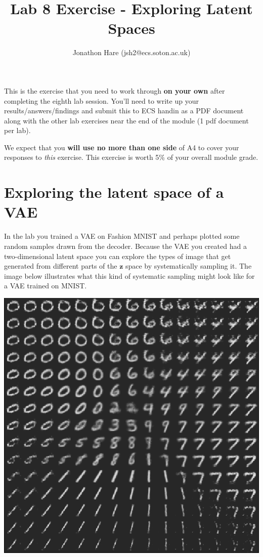 \documentclass[a4paper]{article}
\begin{document}
\lstset{language=Python,upquote=true}

\setlength{\leftskip}{20pt}
\title{Lab 8 Exercise - Exploring Latent Spaces}
\author{Jonathon Hare (jsh2@ecs.soton.ac.uk)}

\maketitle


This is the exercise that you need to work through \textbf{on your own} after completing the eighth lab session. You'll need to write up your results/answers/findings and submit this to ECS handin as a PDF document along with the other lab exercises near the end of the module (1 pdf document per lab). 

We expect that you \textbf{will use no more than one side} of A4 to cover your responses to \emph{this} exercise. This exercise is worth 5\% of your overall module grade.

\section{Exploring the latent space of a VAE}\label{vae}
In the lab you trained a VAE on Fashion MNIST and perhaps plotted some random samples drawn from the decoder. Because the VAE you created had a two-dimensional latent space you can explore the types of image that get generated from different parts of the $\bm z$ space by systematically sampling it. The image below illustrates what this kind of systematic sampling might look like for a VAE trained on MNIST.
\begin{center}
	\includegraphics[scale=0.5]{mnist.png}
\end{center}
\end{document}
